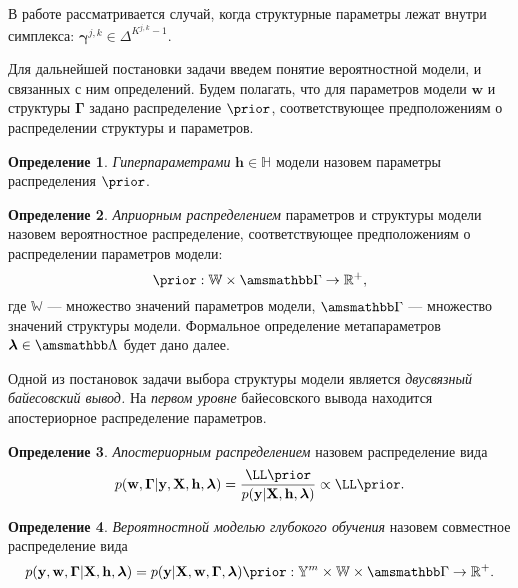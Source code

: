 \documentclass[11pt, a5paper]{dissert}
\theoremstyle{definition}
\newtheorem{defin}{Определение}
\begin{document}
В работе рассматривается случай, когда структурные параметры лежат внутри симплекса: $\boldsymbol{\gamma}^{j,k} \in {\Delta}^{K^{j,k}-1}$.%

Для дальнейшей постановки задачи введем понятие вероятностной модели, и связанных с ним определений. Будем полагать, что для параметров модели $\mathbf{w}$ и структуры  $\boldsymbol{\Gamma}$ задано распределение $\prior$, соответствующее предположениям о распределении структуры и параметров. 

\begin{defin}
\textit{Гиперпараметрами} $\mathbf{h}\in \mathbb{H}$ модели  назовем параметры распределения $\prior$.
\end{defin}

\begin{defin}
\textit{Априорным распределением} параметров и структуры модели назовем вероятностное распределение, соответствующее предположениям о распределении параметров модели:
\[
    \prior: \mathbb{W} \times \Gb \to \mathbb{R}^{+}, 
\]
где $\mathbb{W}$ --- множество значений параметров модели, $\Gb$ --- множество значений структуры модели.%
Формальное определение метапараметров $\lam \in \Lamb$ будет дано далее.
\end{defin}


Одной из постановок задачи выбора структуры модели является \textit{двусвязный байесовский вывод.} 
На \textit{первом уровне} байесовского вывода  находится апостериорное распределение параметров.

\begin{defin}
\textit{Апостериорным распределением} назовем распределение вида
\begin{equation}
\label{eq:posterior}
    \post = \frac{\LL \prior}{\EV} \propto \LL \prior.%
\end{equation}
\end{defin}

\begin{defin}
\textit{Вероятностной моделью глубокого обучения} назовем совместное распределение вида
\[
    p(\y, \mathbf{w},  \boldsymbol{\Gamma}|\X, \mathbf{h}, \lam) = p(\y|\X, \mathbf{w},  \boldsymbol{\Gamma}, \lam)\prior: {\yb}^m \times \mathbb{W}  \times \Gb  \to \mathbb{R}^{+}.
\]
\end{defin}
\end{document}
